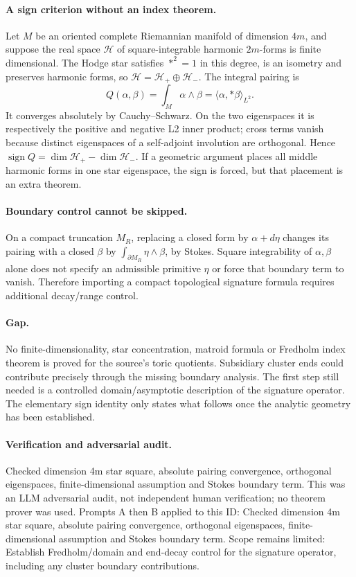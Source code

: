 \documentclass[11pt]{article}
\begin{document}
\paragraph{A sign criterion without an index theorem.}Let \(M\) be an oriented complete Riemannian manifold of dimension \(4m\), and suppose the real space \(\mathcal H\) of square-integrable harmonic \(2m\)-forms is finite dimensional. The Hodge star satisfies \(*^2=1\) in this degree, is an isometry and preserves harmonic forms, so \(\mathcal H=\mathcal H_+\oplus\mathcal H_-\). The integral pairing is
\[Q(\alpha,\beta)=\int_M\alpha\wedge\beta=\langle\alpha,*\beta\rangle_{L^2}.
\]
It converges absolutely by Cauchy--Schwarz. On the two eigenspaces it is respectively the positive and negative L2 inner product; cross terms vanish because distinct eigenspaces of a self-adjoint involution are orthogonal. Hence \(\operatorname{sign}Q=\dim\mathcal H_+-\dim\mathcal H_-\). If a geometric argument places all middle harmonic forms in one star eigenspace, the sign is forced, but that placement is an extra theorem.
\paragraph{Boundary control cannot be skipped.}On a compact truncation \(M_R\), replacing a closed form by \(\alpha+d\eta\) changes its pairing with a closed \(\beta\) by \(\int_{\partial M_R}\eta\wedge\beta\), by Stokes. Square integrability of \(\alpha,\beta\) alone does not specify an admissible primitive \(\eta\) or force that boundary term to vanish. Therefore importing a compact topological signature formula requires additional decay/range control.
\paragraph{Gap.}No finite-dimensionality, star concentration, matroid formula or Fredholm index theorem is proved for the source's toric quotients. Subsidiary cluster ends could contribute precisely through the missing boundary analysis. The first step still needed is a controlled domain/asymptotic description of the signature operator. The elementary sign identity only states what follows once the analytic geometry has been established.

\paragraph{Verification and adversarial audit.}
Checked dimension 4m star square, absolute pairing convergence, orthogonal eigenspaces, finite-dimensional assumption and Stokes boundary term. This was an LLM adversarial audit, not independent human verification; no theorem prover was used. Prompts A then B applied to this ID: Checked dimension 4m star square, absolute pairing convergence, orthogonal eigenspaces, finite-dimensional assumption and Stokes boundary term. Scope remains limited: Establish Fredholm/domain and end-decay control for the signature operator, including any cluster boundary contributions.
\end{document}
